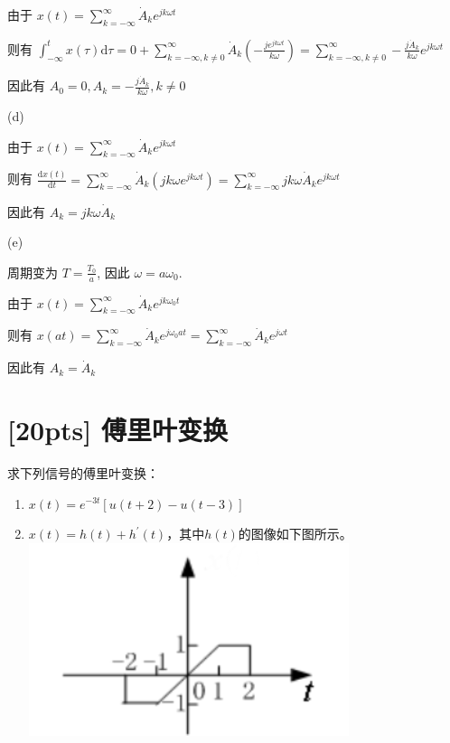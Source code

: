 \documentclass[a4paper,UTF8]{article}
\numberwithin{equation}{section}
\begin{document}
\begin{framed}
\begin{spacing}{1.5}
\begin{itemize}
      由于 $\displaystyle x(t) = \sum_{k=-\infty}^{\infty}\dot{A}_k e^{jk\omega t}$
      
      则有 $\displaystyle \int_{-\infty}^{t}x(\tau)\mathrm{d}\tau = 0 + \sum_{k=-\infty, k\neq 0}^{\infty}\dot{A}_k (- \frac{j e^{j k \omega t}}{k \omega}) = \sum_{k=-\infty, k\neq 0}^{\infty}- \frac{j \dot{A}_k}{k \omega}e^{j k \omega t}$
      
      因此有 $\displaystyle A_0 = 0, A_k = - \frac{j \dot{A}_k}{k \omega}, k \neq 0$
      
      (d)
      
      由于 $\displaystyle x(t) = \sum_{k=-\infty}^{\infty}\dot{A}_k e^{jk\omega t}$
      
      则有 $\displaystyle \frac{\mathrm{d}x(t)}{\mathrm{d}t} = \sum_{k=-\infty}^{\infty}\dot{A}_k (jk\omega e^{jk\omega t}) = \sum_{k=-\infty}^{\infty}jk\omega \dot{A}_k e^{jk\omega t}$
      
      因此有 $\displaystyle A_k = jk\omega \dot{A}_k$
      
      (e)
      
      周期变为 $\displaystyle T = \frac{T_0}{a}$, 因此 $\omega = a \omega_0$.
      
      由于 $\displaystyle x(t) = \sum_{k=-\infty}^{\infty}\dot{A}_k e^{jk\omega_0 t}$
      
      则有 $\displaystyle x(at) = \sum_{k=-\infty}^{\infty}\dot{A}_k e^{j\omega_0 at} = \sum_{k=-\infty}^{\infty}\dot{A}_k e^{j\omega t}$
      
      因此有 $\displaystyle A_k = \dot{A}_k$
    \end{itemize}
\end{spacing}
\end{framed}


\newpage
\section{[20pts] 傅里叶变换}
求下列信号的傅里叶变换：
\begin{enumerate}[(1)]
	\item $x(t)=e^{-3t}\left[u(t+2)-u(t-3)\right]$
	\item $x(t)=h(t)+h^{\prime}(t)$，其中$h(t)$的图像如下图所示。\\
	\includegraphics[scale=0.4]{2.png}
\end{enumerate}
	
\end{document}
